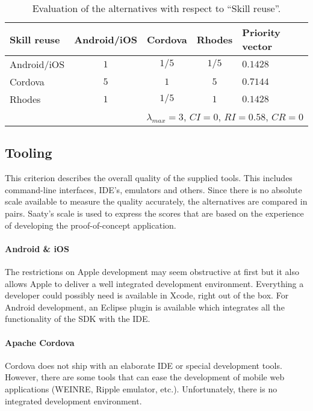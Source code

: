 \begin{table}[h!]
    \begin{center}
        \begin{tabular}{lcccl}
            \hline
            \textbf{Skill reuse} & Android/iOS & Cordova & Rhodes & Priority vector \\
            \hline
            Android/iOS          & $1$         & $1/5$   & $1/5$  & $0.1428$        \\
            Cordova              & $5$         & $1$     & $5$    & $0.7144$        \\
            Rhodes               & $1$         & $1/5$   & $1$    & $0.1428$        \\
            \hline
            \multicolumn{5}{r}{$\lambda_{max} = 3$, $CI = 0$, $RI = 0.58$, $CR = 0$}\\
            \hline
        \end{tabular}
        \caption{Evaluation of the alternatives with respect to ``Skill reuse''.}
        \label{tab:sr}
    \end{center}
\end{table}

\subsection{Tooling}

This criterion describes the overall quality of the supplied tools. This includes command-line interfaces, IDE's, emulators and others. Since there is no absolute scale available to measure the quality accurately, the alternatives are compared in pairs. Saaty's scale is used to express the scores that are based on the experience of developing the proof-of-concept application.

\paragraph{Android \& iOS} The restrictions on Apple development may seem obstructive at first but it also allows Apple to deliver a well integrated development environment. Everything a developer could possibly need is available in Xcode, right out of the box. For Android development, an Eclipse plugin is available which integrates all the functionality of the SDK with the IDE. 

\paragraph{Apache Cordova} Cordova does not ship with an elaborate IDE or special development tools. However, there are some tools that can ease the development of mobile web applications (WEINRE, Ripple emulator, etc.). Unfortunately, there is no integrated development environment. 

